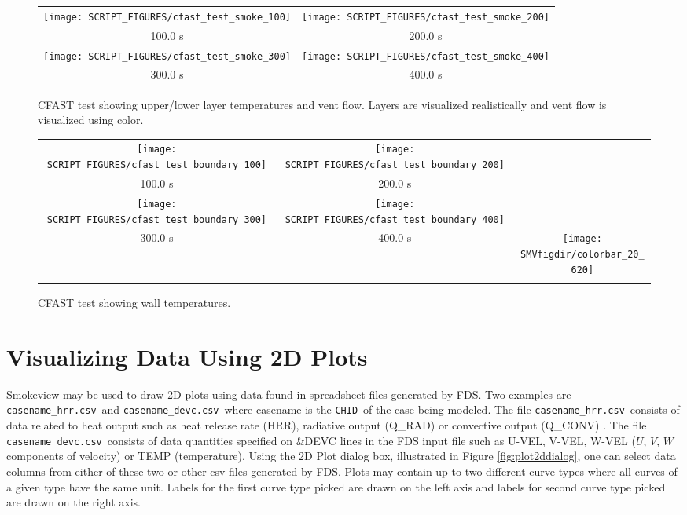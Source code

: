 \documentclass[11pt,twoside]{book}
\begin{document}
\begin{figure}[bph]
\begin{center}
\begin{tabular}{cc}
\texttt{[image: SCRIPT\_FIGURES/cfast\_test\_smoke\_100]}&
\texttt{[image: SCRIPT\_FIGURES/cfast\_test\_smoke\_200]}\\
100.0 s&200.0 s\\
\texttt{[image: SCRIPT\_FIGURES/cfast\_test\_smoke\_300]}&
\texttt{[image: SCRIPT\_FIGURES/cfast\_test\_smoke\_400]}\\
300.0 s&400.0 s\\
\end{tabular}
\end{center}
\caption{CFAST test showing upper/lower layer temperatures and vent flow.
Layers are visualized realistically and vent flow
is visualized using color.}
\label{figcfastsmoke}%
\end{figure}

\begin{figure}[bph]
\begin{center}
\begin{tabular}{ccc}
\texttt{[image: SCRIPT\_FIGURES/cfast\_test\_boundary\_100]}&
\texttt{[image: SCRIPT\_FIGURES/cfast\_test\_boundary\_200]}\\
100.0 s&200.0 s\\
\texttt{[image: SCRIPT\_FIGURES/cfast\_test\_boundary\_300]}&
\texttt{[image: SCRIPT\_FIGURES/cfast\_test\_boundary\_400]}\\
300.0 s&400.0 s
&\raisebox{0.0ex}[0pt]{\texttt{[image: \\SMVfigdir/colorbar\_20\_620]}}\\
\\
\end{tabular}
\end{center}
\caption{CFAST test showing wall temperatures.}
\label{figcfastboundary}%
\end{figure}

\chapter{Visualizing Data Using 2D Plots}

Smokeview may be used to draw 2D plots using data found in spreadsheet files generated by
FDS.  Two examples are
{\tt casename\_hrr.csv}\ and {\tt casename\_devc.csv}\ where casename is the
{\tt CHID}\ of the case being modeled.
The file {\tt casename\_hrr.csv}\ consists of data related
to heat output such as heat release rate (HRR),
radiative output (Q\_RAD) or convective output
(Q\_CONV) .  The file {\tt casename\_devc.csv}\ consists of data quantities specified on \&DEVC lines
in the FDS input file
such as U-VEL, V-VEL, W-VEL ($U$, $V$, $W$ components of velocity) or TEMP (temperature).
Using the 2D Plot dialog box, illustrated in Figure \ref{fig:plot2ddialog},
one can select data columns from either of these two or other csv files
generated by FDS. Plots may contain up to two different curve types
where all curves of a given type have the same unit.
Labels for the first curve type picked are drawn on the left axis
and labels for second curve type picked are drawn on the right axis.
\end{document}
